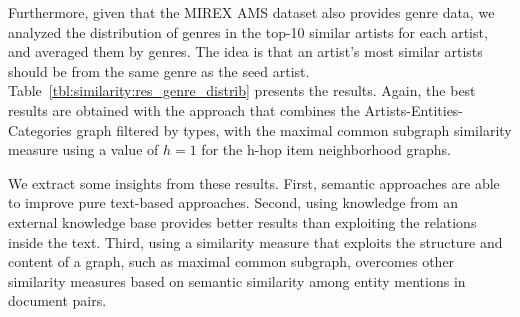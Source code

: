 Furthermore, given that the MIREX AMS dataset also provides genre data, we analyzed the distribution of genres in the top-10 similar artists for each artist, and averaged them by genres. The idea is that an artist's most similar artists should be from the same genre as the seed artist.
Table~\ref{tbl:similarity:res_genre_distrib} presents the results. Again, the best results are obtained with the approach that combines the Artists-Entities-Categories graph filtered by types, with the maximal common subgraph similarity measure using a value of $h=1$ for the h-hop item neighborhood graphs.

We extract some insights from these results. First, semantic approaches are able to improve pure text-based approaches. Second, using knowledge from an external knowledge base provides better results than exploiting the relations inside the text. Third, using a similarity measure that exploits the structure and content of a graph, such as maximal common subgraph, overcomes other similarity measures based on semantic similarity among entity mentions in document pairs.





